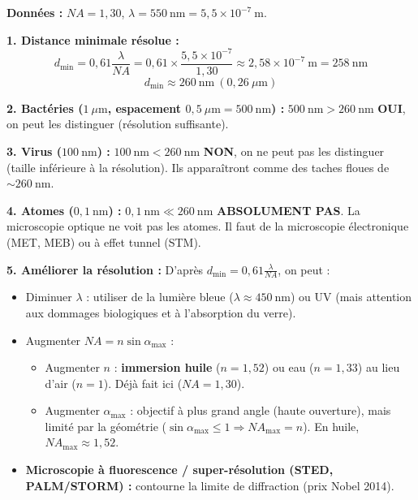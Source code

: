 \documentclass[11pt]{article}
\begin{document}
\begin{exoresolu}
\textbf{Données :} $NA = 1,30$, $\lambda = 550\ \text{nm} = 5,5 \times 10^{-7}\ \text{m}$.

\textbf{1. Distance minimale résolue :}
\[
d_{\text{min}} = 0,61 \frac{\lambda}{NA} = 0,61 \times \frac{5,5 \times 10^{-7}}{1,30} \approx 2,58 \times 10^{-7}\ \text{m} = 258\ \text{nm}
\]
\[
\boxed{d_{\text{min}} \approx 260\ \text{nm} \ (0,26\ \mu\text{m})}
\]

\textbf{2. Bactéries ($1\ \mu\text{m}$, espacement $0,5\ \mu\text{m} = 500\ \text{nm}$) :}
$500\ \text{nm} > 260\ \text{nm}$ \Rightarrow \textbf{OUI}, on peut les distinguer (résolution suffisante).

\textbf{3. Virus ($100\ \text{nm}$) :}
$100\ \text{nm} < 260\ \text{nm}$ \Rightarrow \textbf{NON}, on ne peut pas les distinguer (taille inférieure à la résolution). Ils apparaîtront comme des taches floues de $\sim 260\ \text{nm}$.

\textbf{4. Atomes ($0,1\ \text{nm}$) :}
$0,1\ \text{nm} \ll 260\ \text{nm}$ \Rightarrow \textbf{ABSOLUMENT PAS}. La microscopie optique ne voit pas les atomes. Il faut de la microscopie électronique (MET, MEB) ou à effet tunnel (STM).

\textbf{5. Améliorer la résolution :}
D'après $d_{\text{min}} = 0,61 \frac{\lambda}{NA}$, on peut :
\begin{itemize}
    \item Diminuer $\lambda$ : utiliser de la lumière bleue ($\lambda \approx 450\ \text{nm}$) ou UV (mais attention aux dommages biologiques et à l'absorption du verre).
    \item Augmenter $NA = n \sin \alpha_{\text{max}}$ :
    \begin{itemize}
        \item Augmenter $n$ : \textbf{immersion huile} ($n=1,52$) ou eau ($n=1,33$) au lieu d'air ($n=1$). Déjà fait ici ($NA=1,30$).
        \item Augmenter $\alpha_{\text{max}}$ : objectif à plus grand angle (haute ouverture), mais limité par la géométrie ($\sin \alpha_{\text{max}} \le 1 \Rightarrow NA_{\text{max}} = n$). En huile, $NA_{\text{max}} \approx 1,52$.
    \end{itemize}
    \item \textbf{Microscopie à fluorescence / super-résolution (STED, PALM/STORM) :} contourne la limite de diffraction (prix Nobel 2014).
\end{itemize}
\end{exoresolu}
\end{document}
